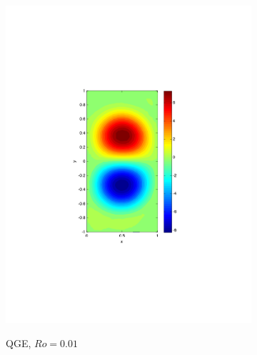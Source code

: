 \begin{figure}
\begin{center}
\begin{subfigure}{0.3\textwidth}
    \includegraphics[scale=0.5]{Figures/Re200Ro1E-2h16k1000}
    \label{sfi:QGERo0.01}
    \caption{QGE, $Ro=0.01$}
  \end{subfigure}
  \begin{subfigure}{0.3\textwidth}
    \centering

\end{subfigure}
\end{center}
\end{figure}
